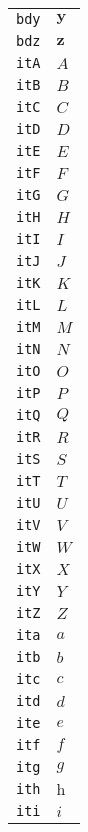 \begin{longtable}{ll}
\texttt{bdy}&${}\textbf{y}{}$\\
\texttt{bdz}&${}\textbf{z}{}$\\
\texttt{itA}&${}\textit{A}{}$\\
\texttt{itB}&${}\textit{B}{}$\\
\texttt{itC}&${}\textit{C}{}$\\
\texttt{itD}&${}\textit{D}{}$\\
\texttt{itE}&${}\textit{E}{}$\\
\texttt{itF}&${}\textit{F}{}$\\
\texttt{itG}&${}\textit{G}{}$\\
\texttt{itH}&${}\textit{H}{}$\\
\texttt{itI}&${}\textit{I}{}$\\
\texttt{itJ}&${}\textit{J}{}$\\
\texttt{itK}&${}\textit{K}{}$\\
\texttt{itL}&${}\textit{L}{}$\\
\texttt{itM}&${}\textit{M}{}$\\
\texttt{itN}&${}\textit{N}{}$\\
\texttt{itO}&${}\textit{O}{}$\\
\texttt{itP}&${}\textit{P}{}$\\
\texttt{itQ}&${}\textit{Q}{}$\\
\texttt{itR}&${}\textit{R}{}$\\
\texttt{itS}&${}\textit{S}{}$\\
\texttt{itT}&${}\textit{T}{}$\\
\texttt{itU}&${}\textit{U}{}$\\
\texttt{itV}&${}\textit{V}{}$\\
\texttt{itW}&${}\textit{W}{}$\\
\texttt{itX}&${}\textit{X}{}$\\
\texttt{itY}&${}\textit{Y}{}$\\
\texttt{itZ}&${}\textit{Z}{}$\\
\texttt{ita}&${}\textit{a}{}$\\
\texttt{itb}&${}\textit{b}{}$\\
\texttt{itc}&${}\textit{c}{}$\\
\texttt{itd}&${}\textit{d}{}$\\
\texttt{ite}&${}\textit{e}{}$\\
\texttt{itf}&${}\textit{f}{}$\\
\texttt{itg}&${}\textit{g}{}$\\
\texttt{ith}&${}\textit{h}{}$\\
\texttt{iti}&${}\textit{i}{}$\\

\end{longtable}
